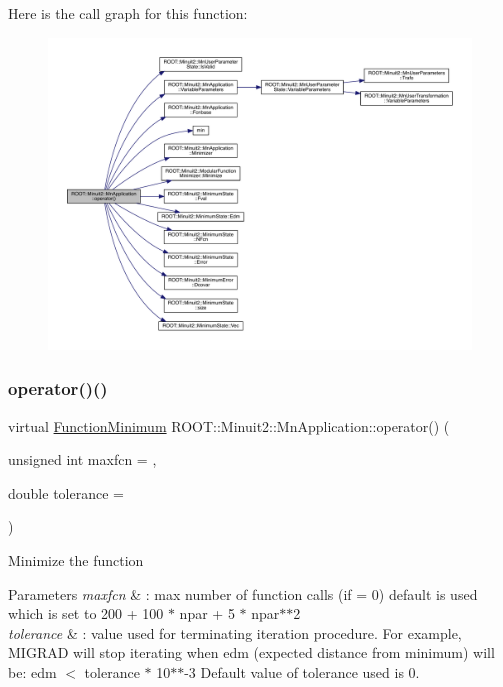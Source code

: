 Here is the call graph for this function\+:\nopagebreak
\begin{figure}[H]
\begin{center}
\leavevmode
\includegraphics[width=350pt]{df/dd5/classROOT_1_1Minuit2_1_1MnApplication_a8908d50d5d4f7f011b94bd10e51eacf7_cgraph}
\end{center}
\end{figure}
\mbox{\label{classROOT_1_1Minuit2_1_1MnApplication_a67d746cf939174c8da6552636a11154a}} 
\subsubsection{\texorpdfstring{operator()()}{operator()()}\hspace{0.1cm}{\footnotesize\ttfamily [2/2]}}
{\footnotesize\ttfamily virtual \mbox{\hyperlink{classROOT_1_1Minuit2_1_1FunctionMinimum}{Function\+Minimum}} R\+O\+O\+T\+::\+Minuit2\+::\+Mn\+Application\+::operator() (\begin{DoxyParamCaption}\item[{unsigned int}]{maxfcn = {},  }\item[{double}]{tolerance = {} }\end{DoxyParamCaption})\hspace{0.3cm}{\ttfamily [virtual]}}

Minimize the function 
\begin{DoxyParams}{Parameters}
{\em maxfcn} & \+: max number of function calls (if = 0) default is used which is set to 200 + 100 $\ast$ npar + 5 $\ast$ npar$\ast$$\ast$2 \\
\hline
{\em tolerance} & \+: value used for terminating iteration procedure. For example, M\+I\+G\+R\+AD will stop iterating when edm (expected distance from minimum) will be\+: edm $<$ tolerance $\ast$ 10$\ast$$\ast$-\/3 Default value of tolerance used is 0. \\
\hline
\end{DoxyParams}


